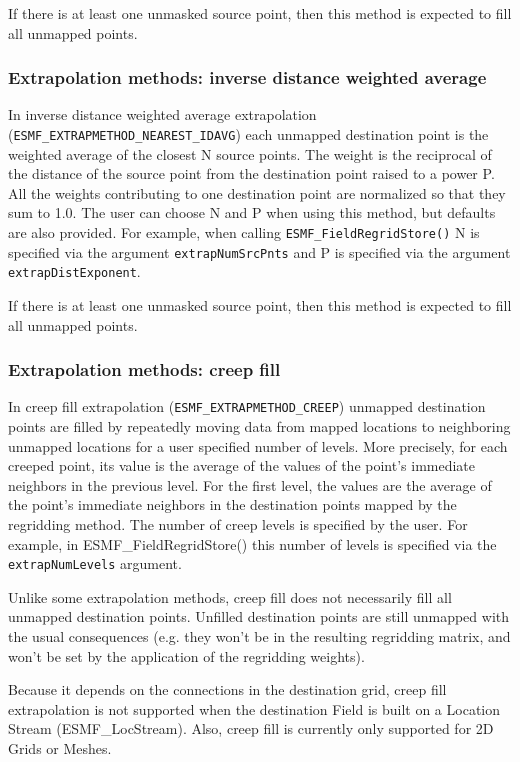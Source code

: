 If there is at least one unmasked source point, then this method is expected to fill all unmapped points. 

\subsubsection{Extrapolation methods: inverse distance weighted average}\label{sec:extrapolation:nearestidavg}
In inverse distance weighted average extrapolation ({\tt ESMF\_EXTRAPMETHOD\_NEAREST\_IDAVG}) each unmapped 
destination point is the weighted average of the closest N source points. The weight is 
the reciprocal of the distance of the source point from the destination point raised to a power P.
All the weights contributing to one destination point are normalized so that they sum to 1.0. 
The user can choose N and P when using this method, but defaults are also provided. For example, when 
calling {\tt ESMF\_FieldRegridStore()} N is specified via the argument {\tt extrapNumSrcPnts} and 
P is specified via the argument {\tt extrapDistExponent}.  

If there is at least one unmasked source point, then this method is expected to fill all unmapped points. 

\subsubsection{Extrapolation methods: creep fill}\label{sec:extrapolation:creep}
In creep fill extrapolation ({\tt ESMF\_EXTRAPMETHOD\_CREEP}) unmapped destination points are filled by 
repeatedly moving data from mapped locations to neighboring unmapped locations for a user specified 
number of levels. More precisely, for each creeped point, its value is the average of the values of the 
point's immediate neighbors in the previous level. For the first level, the values are the average of the 
point's immediate neighbors in the destination points mapped by the regridding method. The number of creep levels
is specified by the user. For example, in ESMF\_FieldRegridStore() this number of levels is specified 
via the {\tt extrapNumLevels} argument. 

Unlike some extrapolation methods, creep fill does not necessarily 
fill all unmapped destination points. Unfilled destination points are still unmapped with the usual 
consequences (e.g. they won't be in the resulting regridding matrix, and won't be set by the application 
of the regridding weights).

Because it depends on the connections in the destination grid, creep fill extrapolation is not supported when the 
destination Field is built on a Location Stream (ESMF\_LocStream). Also, creep fill is currently only supported for 
2D Grids or Meshes.

